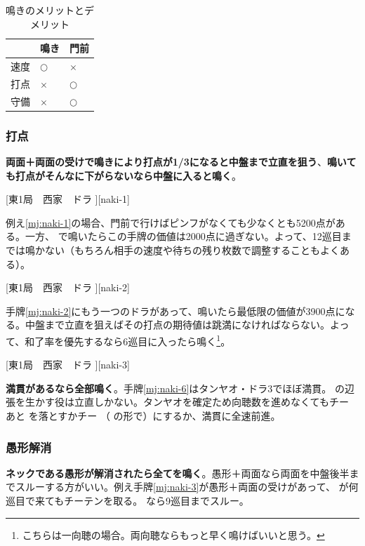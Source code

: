 \documentclass[10pt, twocolumn]{article}
\begin{document}
\begin{table}[ht]
  \centering
  \begin{tabular}{lll}
    & 鳴き & 門前 \\
    \hline
    速度 & $\bigcirc$ & $\times$ \\
    打点 & $\times$ & $\bigcirc$ \\
    守備 & $\times$ & $\bigcirc$
  \end{tabular}
  \caption{鳴きのメリットとデメリット\citep[][p.~87]{hirasawa-naki}}
  \label{tab:naki-compare}
\end{table}

\subsubsection*{打点}

\textbf{両面＋両面の受けで鳴きにより打点が1/3になると中盤まで立直を狙う}\citep[][p.~33]{hirasawa-naki}、\textbf{鳴いても打点がそんなに下がらないなら中盤に入ると鳴く}\citep[][p.~38]{hirasawa-naki}。

[東1局　西家　ドラ ][naki-1]

例え\ref{mj:naki-1}の場合、門前で行けばピンフがなくても少なくとも5200点がある。一方、 で鳴いたらこの手牌の価値は2000点に過ぎない。よって、12巡目までは鳴かない（もちろん相手の速度や待ちの残り枚数で調整することもよくある）。

[東1局　西家　ドラ ][naki-2]

手牌\ref{mj:naki-2}にもう一つのドラがあって、鳴いたら最低限の価値が3900点になる。中盤まで立直を狙えばその打点の期待値は跳満になければならない。よって、和了率を優先するなら6巡目に入ったら鳴く\footnote{こちらは一向聴の場合。両向聴ならもっと早く鳴けばいいと思う。}。

[東1局　西家　ドラ ][naki-3]

\textbf{満貫があるなら全部鳴く}\citep[][p.~61]{hirasawa-naki}。手牌\ref{mj:naki-6}はタンヤオ・ドラ3でほぼ満貫。 の辺張を生かす役は立直しかない。タンヤオを確定ため向聴数を進めなくてもチー  あと  を落とすかチー （ の形で）にするか、満貫に全速前進。

\subsubsection*{愚形解消}

\textbf{ネックである愚形が解消されたら全てを鳴く}\citep[][p.~40]{hirasawa-naki}。愚形＋両面なら両面を中盤後半までスルーする方がいい。例え手牌\ref{mj:naki-3}が愚形＋両面の受けがあって、 が何巡目で来てもチーテンを取る。 なら9巡目までスルー。
\end{document}
